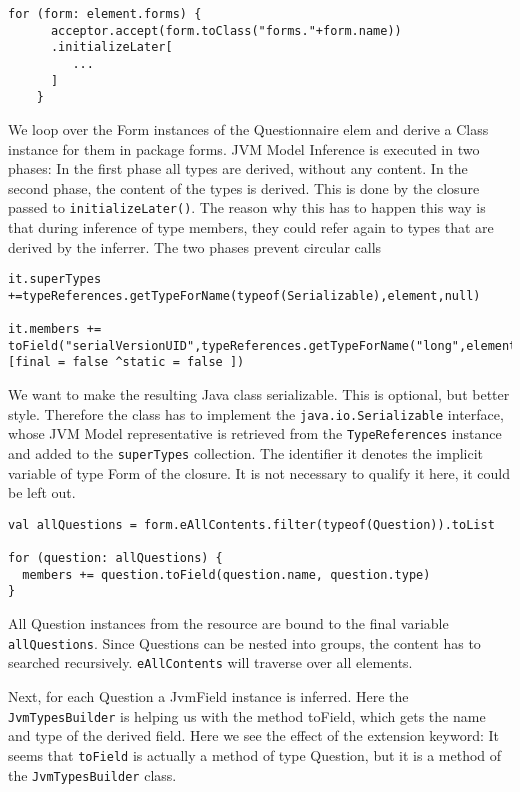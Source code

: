 \begin{lstlisting}[language=Xtend]
    for (form: element.forms) {
      acceptor.accept(form.toClass("forms."+form.name))
      .initializeLater[
         ...
      ]
    }
\end{lstlisting}

We loop over the Form instances of the Questionnaire elem and derive a Class
instance for them in package forms. JVM Model Inference is executed in two
phases: In the first phase all types are derived, without any content. In the
second phase, the content of the types is derived. This is done by the closure
passed to \texttt{initializeLater()}. The reason why this has to happen this way is that
during inference of type members, they could refer again to types that are
derived by the inferrer. The two phases prevent circular calls

\begin{lstlisting}[language=Xtend]
it.superTypes +=typeReferences.getTypeForName(typeof(Serializable),element,null)

it.members += toField("serialVersionUID",typeReferences.getTypeForName("long",element),[final = false ^static = false ])
\end{lstlisting}
        
We want to make the resulting Java class serializable. This is optional, but
better style. Therefore the class has to implement the \texttt{java.io.Serializable}
interface, whose JVM Model representative is retrieved from the \texttt{TypeReferences}
instance and added to the \texttt{superTypes} collection. The identifier it denotes the
implicit variable of type Form of the closure. It is not necessary to qualify it
here, it could be left out.

\begin{lstlisting}[language=Xtend]
val allQuestions = form.eAllContents.filter(typeof(Question)).toList

for (question: allQuestions) {
  members += question.toField(question.name, question.type)
}
\end{lstlisting}

All Question instances from the resource are bound to the final variable
\texttt{allQuestions}. Since Questions can be nested into groups, the content has to
searched recursively. \texttt{eAllContents} will traverse over all elements.

Next, for each Question a JvmField instance is inferred. Here the
\texttt{JvmTypesBuilder} is helping us with the method toField, which gets the name and
type of the derived field. Here we see the effect of the extension keyword: It
seems that \texttt{toField} is actually a method of type Question, but it is a method of
the \texttt{JvmTypesBuilder} class.

